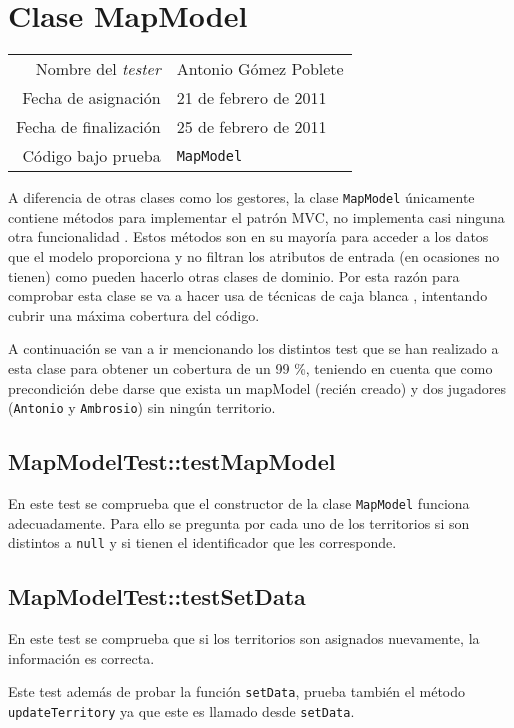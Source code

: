 \section{Clase MapModel}

{\small
\begin{tabular}{r|l}
Nombre del \textit{tester} & Antonio Gómez Poblete \\
Fecha de asignación & 21 de febrero de 2011 \\
Fecha de finalización & 25 de febrero de 2011 \\
Código bajo prueba & \texttt{MapModel}
\end{tabular}
}

A diferencia de otras clases como los gestores, la clase \texttt{MapModel} únicamente contiene métodos para implementar el patrón MVC, no  implementa casi ninguna otra funcionalidad . Estos métodos son en su mayoría para acceder a los datos que el modelo proporciona y no filtran los atributos de entrada (en ocasiones no tienen) como pueden hacerlo otras clases de dominio. Por esta razón para comprobar esta clase se va a hacer usa de técnicas de caja blanca , intentando cubrir una máxima cobertura del código.  

A continuación se van a ir mencionando los distintos test que se han realizado a esta clase para obtener un cobertura de un 99 \%, teniendo en cuenta que como precondición debe darse que exista un mapModel (recién creado) y dos jugadores (\texttt{Antonio} y \texttt{Ambrosio}) sin ningún territorio.  


\subsection{MapModelTest::testMapModel} 

En este test se comprueba que el constructor de la clase \texttt{MapModel} funciona adecuadamente. Para ello se pregunta por cada uno de los territorios si  son distintos a \texttt{null} y si tienen el identificador que les corresponde.

\subsection {MapModelTest::testSetData}

En este test se comprueba que si los territorios son asignados nuevamente, la información es correcta.

Este test además de probar la función \texttt{setData}, prueba también el método \texttt{updateTerritory} ya que este es llamado desde \texttt{setData}.

